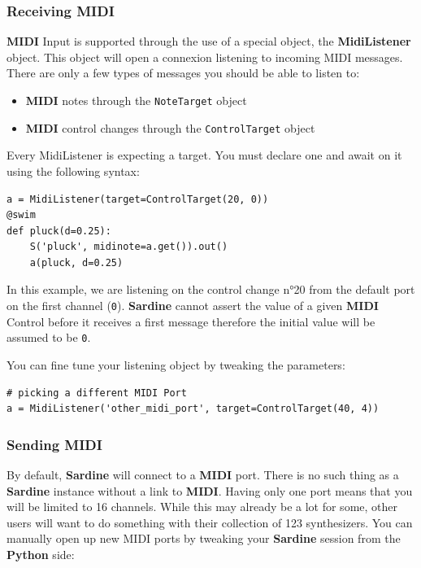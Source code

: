 \documentclass[11pt]{article}
\begin{document}
\subsubsection{Receiving MIDI}
\label{sec:org33d65ed}

\textbf{MIDI} Input is supported through the use of a special object, the \textbf{MidiListener} object. This object will open a connexion listening to incoming MIDI messages. There are only a few types of messages you should be able to listen to:

\begin{itemize}
\item \textbf{MIDI} notes through the \texttt{NoteTarget} object
\item \textbf{MIDI} control changes through the \texttt{ControlTarget} object
\end{itemize}

Every MidiListener is expecting a target. You must declare one and await on it using the following syntax:

\begin{verbatim}
a = MidiListener(target=ControlTarget(20, 0))
@swim
def pluck(d=0.25):
    S('pluck', midinote=a.get()).out()
    a(pluck, d=0.25)
\end{verbatim}

In this example, we are listening on the control change n°20 from the default port on the first channel (\texttt{0}). \textbf{Sardine} cannot assert the value of a given \textbf{MIDI} Control before it receives a first message therefore the initial value will be assumed to be \texttt{0}.

You can fine tune your listening object by tweaking the parameters:

\begin{verbatim}
# picking a different MIDI Port
a = MidiListener('other_midi_port', target=ControlTarget(40, 4))
\end{verbatim}

\subsubsection{Sending MIDI}
\label{sec:org341de94}

By default, \textbf{Sardine} will connect to a \textbf{MIDI} port. There is no such thing as a \textbf{Sardine} instance without a link to \textbf{MIDI}. Having only one port means that you will be limited to 16 channels. While this may already be a lot for some, other users will want to do something with their collection of 123 synthesizers. You can manually open up new MIDI ports by tweaking your \textbf{Sardine} session from the \textbf{Python} side:
\end{document}
